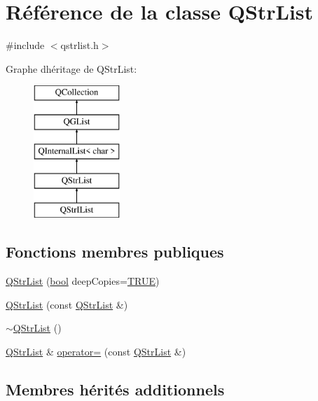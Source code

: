 \hypertarget{class_q_str_list}{}\section{Référence de la classe Q\+Str\+List}
\label{class_q_str_list}


{\ttfamily \#include $<$qstrlist.\+h$>$}

Graphe d\textquotesingle{}héritage de Q\+Str\+List\+:\begin{figure}[H]
\begin{center}
\leavevmode
\includegraphics[height=5.000000cm]{class_q_str_list}
\end{center}
\end{figure}
\subsection*{Fonctions membres publiques}
\begin{DoxyCompactItemize}
\item 
\hyperlink{class_q_str_list_aad024fc3e8fcdbb556862b08aceb6f10}{Q\+Str\+List} (\hyperlink{qglobal_8h_a1062901a7428fdd9c7f180f5e01ea056}{bool} deep\+Copies=\hyperlink{qglobal_8h_a04a6422a52070f0dc478693da640242b}{T\+R\+U\+E})
\item 
\hyperlink{class_q_str_list_ae4faa893d4171b032b4015c1e512172b}{Q\+Str\+List} (const \hyperlink{class_q_str_list}{Q\+Str\+List} \&)
\item 
\hyperlink{class_q_str_list_af66770718bcb589dc2a36f30c063b672}{$\sim$\+Q\+Str\+List} ()
\item 
\hyperlink{class_q_str_list}{Q\+Str\+List} \& \hyperlink{class_q_str_list_a8d0c78bb1552ee0d06f45cd00bd86bfc}{operator=} (const \hyperlink{class_q_str_list}{Q\+Str\+List} \&)
\end{DoxyCompactItemize}
\subsection*{Membres hérités additionnels}


